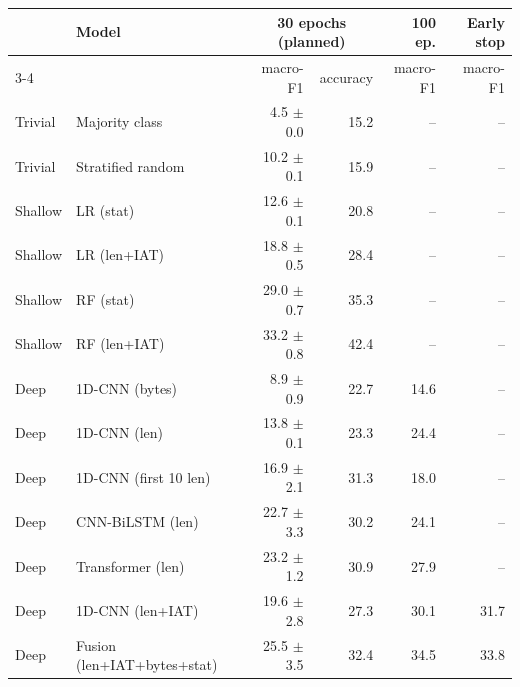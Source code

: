 \begin{tabular}{llrrrr}
\toprule
 & Model & \multicolumn{2}{c}{30 epochs (planned)} & 100 ep. & Early stop \\
\cmidrule(lr){3-4}
 & & macro-F1 & accuracy & macro-F1 & macro-F1 \\
\midrule
Trivial & Majority class & 4.5 $\pm$ 0.0 & 15.2 & -- & -- \\
Trivial & Stratified random & 10.2 $\pm$ 0.1 & 15.9 & -- & -- \\
Shallow & LR (stat) & 12.6 $\pm$ 0.1 & 20.8 & -- & -- \\
Shallow & LR (len+IAT) & 18.8 $\pm$ 0.5 & 28.4 & -- & -- \\
Shallow & RF (stat) & 29.0 $\pm$ 0.7 & 35.3 & -- & -- \\
Shallow & RF (len+IAT) & 33.2 $\pm$ 0.8 & 42.4 & -- & -- \\
Deep & 1D-CNN (bytes) & 8.9 $\pm$ 0.9 & 22.7 & 14.6 & -- \\
Deep & 1D-CNN (len) & 13.8 $\pm$ 0.1 & 23.3 & 24.4 & -- \\
Deep & 1D-CNN (first 10 len) & 16.9 $\pm$ 2.1 & 31.3 & 18.0 & -- \\
Deep & CNN-BiLSTM (len) & 22.7 $\pm$ 3.3 & 30.2 & 24.1 & -- \\
Deep & Transformer (len) & 23.2 $\pm$ 1.2 & 30.9 & 27.9 & -- \\
Deep & 1D-CNN (len+IAT) & 19.6 $\pm$ 2.8 & 27.3 & 30.1 & 31.7 \\
Deep & Fusion (len+IAT+bytes+stat) & 25.5 $\pm$ 3.5 & 32.4 & 34.5 & 33.8 \\
\bottomrule
\end{tabular}
